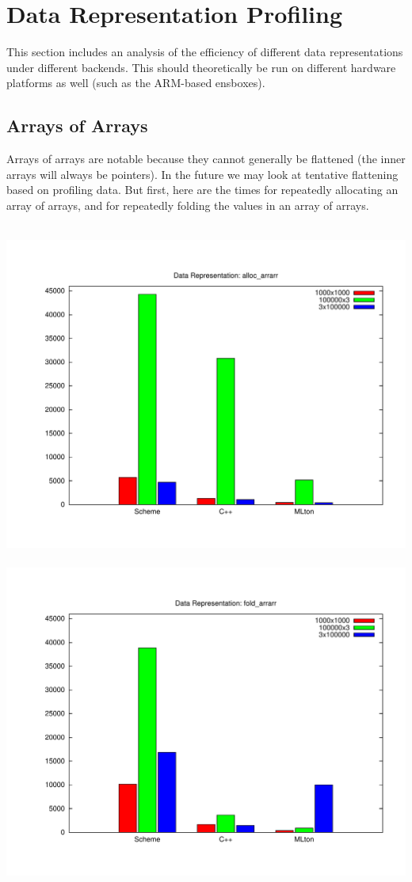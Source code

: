 \documentclass{article}
\begin{document}
\section{Data Representation Profiling}

This section includes an analysis of the efficiency of different data
representations under different backends.  This should theoretically
be run on different hardware platforms as well (such as the ARM-based ensboxes).

\subsection{Arrays of Arrays}

Arrays of arrays are notable because they cannot generally be
flattened (the inner arrays will always be pointers).  In the future
we may look at tentative flattening based on profiling data.  But
first, here are the times for repeatedly allocating an array of
arrays, and for repeatedly folding the values in an array of arrays.

\begin{center}
\mbox{
\includegraphics[width=0.48\hsize]{datareps/alloc_arrarr.pdf}
\includegraphics[width=0.48\hsize]{datareps/fold_arrarr.pdf}
}
\end{center}
\end{document}
